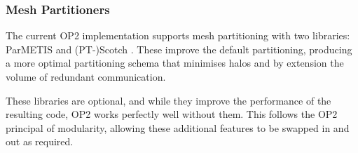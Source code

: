 \subsubsection{Mesh Partitioners}
The current OP2 implementation supports mesh partitioning with two libraries: ParMETIS \cite{ParMETIS} and (PT-)Scotch \cite{PTScotch}. These improve the default partitioning, producing a more optimal partitioning schema that minimises halos and by extension the volume of redundant communication.

These libraries are optional, and while they improve the performance of the resulting code, OP2 works perfectly well without them. This follows the OP2 principal of modularity, allowing these additional features to be swapped in and out as required.

